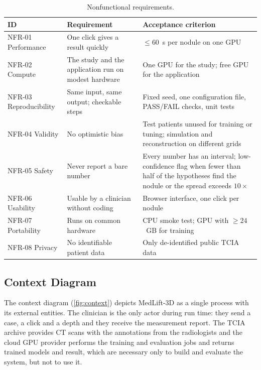 \begin{table}[!htbp]
\centering\small
\caption{Nonfunctional requirements.}
\label{tab:nfr}
\begin{tabularx}{\linewidth}{>{\raggedright\arraybackslash}p{3.2cm} >{\raggedright\arraybackslash}X >{\raggedright\arraybackslash}X}
\toprule
ID & Requirement & Acceptance criterion \\
\midrule
NFR-01 Performance & One click gives a result quickly & $\leq 60$~s per nodule on one GPU \\
NFR-02 Compute & The study and the application run on modest hardware & One GPU for the study; free GPU for the application \\
NFR-03 Reproducibility & Same input, same output; checkable steps & Fixed seed, one configuration file, PASS/FAIL checks, unit tests \\
NFR-04 Validity & No optimistic bias & Test patients unused for training or tuning; simulation and reconstruction on different grids \\
NFR-05 Safety & Never report a bare number & Every number has an interval; low-confidence flag when fewer than half of the hypotheses find the nodule or the spread exceeds $10\times$ \\
NFR-06 Usability & Usable by a clinician without coding & Browser interface, one click per nodule \\
NFR-07 Portability & Runs on common hardware & CPU smoke test; GPU with $\geq 24$~GB for training \\
NFR-08 Privacy & No identifiable patient data & Only de-identified public TCIA data \\
\bottomrule
\end{tabularx}
\end{table}

\subsection{Context Diagram}

The context diagram (\cref{fig:context}) depicts MedLift-3D as a single process with its external entities. The clinician is the only actor during run time: they send a case, a click and a depth and they receive the measurement report. The TCIA archive provides CT scans with the annotations from the radiologists and the cloud GPU provider performs the training and evaluation jobs and returns trained models and result, which are necessary only to build and evaluate the system, but not to use it.

